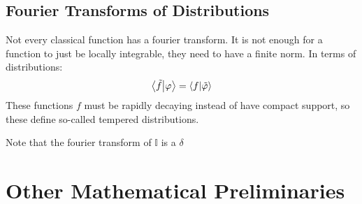 \documentclass[12pt]{article}
\theoremstyle{plain}
\theoremstyle{definition}
\newcommand{\vphi}{\varphi}
\begin{document}
\subsection{Fourier Transforms of Distributions}
Not every classical function has a fourier transform. It is not enough for a function to just be locally integrable, they need to have a finite norm. In terms of distributions:
\begin{align*}
  \ip{\tilde{f}}{\vphi}=\ip{f}{\tilde{\vphi}}
\end{align*}
These functions $f$ must be rapidly decaying instead of have compact support, so these define so-called tempered distributions.

Note that the fourier transform of $\mathbb{I}$ is a $\delta$
\section{Other Mathematical Preliminaries}
\end{document}
